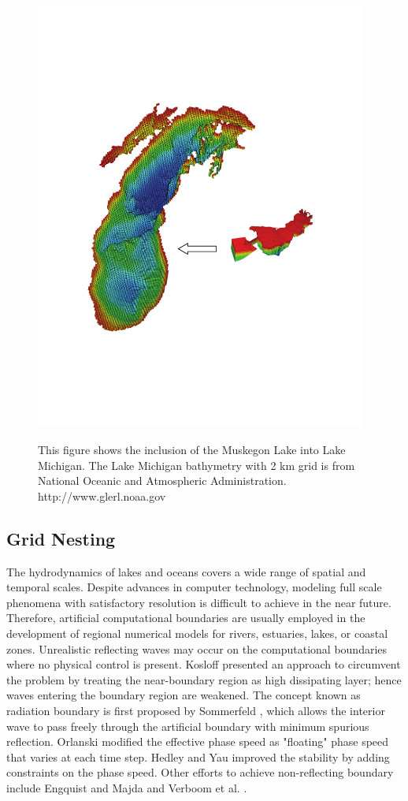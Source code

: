 \begin{figure}[h]
\begin{center}
\includegraphics[width=4.3in]{../figures/LakeM+Muskegon.pdf}
\label{fig:LakeM+Muskegon}
\caption{This figure shows the inclusion of the Muskegon Lake into Lake Michigan. The Lake Michigan bathymetry with 2 km grid is from National Oceanic and Atmospheric Administration. http://www.glerl.noaa.gov}
\end{center}
\end{figure}

\normalsize
\subsection{Grid Nesting}

The hydrodynamics of lakes and oceans covers a wide range of spatial and temporal scales. Despite advances in computer technology, modeling full scale phenomena with satisfactory resolution is difficult to achieve in the near future. Therefore, artificial computational boundaries are usually employed in the development of regional numerical models for rivers, estuaries, lakes, or coastal zones. Unrealistic reflecting waves may occur on the computational boundaries where no physical control is present.
Kosloff \cite{Kosloff1986} presented an approach to circumvent the problem by treating the near-boundary region as high dissipating layer; hence waves entering the boundary region are weakened. The concept known as radiation boundary is first
proposed by Sommerfeld \cite{Sommerfeld1949}, which allows the interior wave to pass freely through the artificial boundary with minimum spurious reflection. Orlanski \cite{Orlanski1976} modified the effective phase speed as "floating" phase speed that varies at each time step. Hedley and Yau \cite{Hedley1988} improved the stability by adding constraints on the phase speed. Other efforts to achieve non-reflecting boundary include Engquist and Majda \cite{Engquist1977} and Verboom et al. \cite{Verboom1982}.

